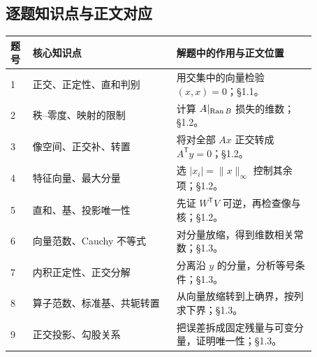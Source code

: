 \subsection*{逐题知识点与正文对应}
\begin{center}
\small
\renewcommand{\arraystretch}{1.35}
\begin{tabular}{p{0.06\linewidth}p{0.41\linewidth}p{0.40\linewidth}}
\toprule
题号 & 核心知识点 & 解题中的作用与正文位置\\
\midrule
1 & 正交、正定性、直和判别 & 用交集中的向量检验 $(x,x)=0$；\S1.1。\\
2 & 秩--零度、映射的限制 & 计算 $A|_{\operatorname{Ran} B}$ 损失的维数；\S1.2。\\
3 & 像空间、正交补、转置 & 将对全部 $Ax$ 正交转成 $A^{\mathsf T}y=0$；\S1.2。\\
4 & 特征向量、最大分量 & 选 $|x_i|=\|x\|_\infty$ 控制其余项；\S1.2。\\
5 & 直和、基、投影唯一性 & 先证 $W^{\mathsf T}V$ 可逆，再检查像与核；\S1.2。\\
6 & 向量范数、Cauchy 不等式 & 对分量放缩，得到维数相关常数；\S1.3。\\
7 & 内积正定性、正交分解 & 分离沿 $y$ 的分量，分析等号条件；\S1.3。\\
8 & 算子范数、标准基、共轭转置 & 从向量放缩转到上确界，按列求下界；\S1.3。\\
9 & 正交投影、勾股关系 & 把误差拆成固定残量与可变分量，证明唯一性；\S1.3。\\
\bottomrule
\end{tabular}
\end{center}

\endgroup
